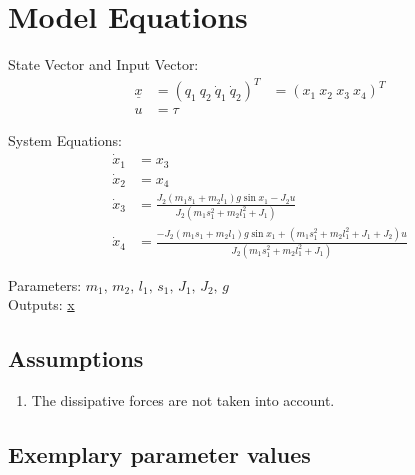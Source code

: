 \documentclass[10pt,a4paper]{article}
\begin{document}
	
	\section{Model Equations} %
	
	State Vector and Input Vector:
	\begin{align*}
		\underline{x} &= (q_1 \ q_2 \ \dot{q}_1 \ \dot{q}_2)^T &= (x_1 \ x_2 \ x_3 \ x_4)^T \\
		u &= \tau
	\end{align*}
	
	\noindent System Equations:			
	\begin{subequations}
	\begin{align}
		\dot{x}_1 &= x_3 \\
		\dot{x}_2 &= x_4 \\
		\dot{x}_3 &= \frac{J_2(m_1s_1 + m_2l_1)g \sin x_1 - J_2u}{J_2(m_1s_1^2 + m_2l_1^2 + J_1)} \\
		\dot{x}_4 &= \frac{-J_2(m_1s_1 + m_2l_1)g \sin x_1 + (m_1s_1^2 + m_2l_1^2 + J_1 + J_2)u}{J_2(m_1s_1^2 + m_2l_1^2 + J_1)}
	\end{align}
	\end{subequations}

	\noindent
	Parameters: $m_1, \, m_2, \, l_1, \, s_1, \, J_1, \, J_2, \, g$ %
	\\
	Outputs: \underline{x}
	
	
	\subsection{Assumptions} %
		\begin{enumerate} %
			\item The dissipative forces are not taken into account. 
		\end{enumerate}
	
	
	\subsection{Exemplary parameter values}
	
\end{document}

